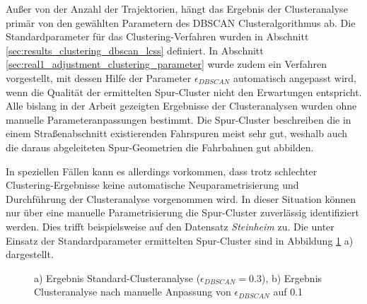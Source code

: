 Außer von der Anzahl der Trajektorien, hängt das Ergebnis der Clusteranalyse primär von den gewählten
Parametern des DBSCAN Clusteralgorithmus ab. Die Standardparameter für das Clustering-Verfahren wurden
in Abschnitt \ref{sec:results_clustering_dbscan_lcss} definiert. In Abschnitt \ref{sec:real1_adjustment_clustering_parameter}
wurde zudem ein Verfahren vorgestellt, mit dessen Hilfe der Parameter $\epsilon_{DBSCAN}$
automatisch angepasst wird, wenn die Qualität der ermittelten Spur-Cluster nicht den Erwartungen entspricht.
Alle bislang in der Arbeit gezeigten Ergebnisse der Clusteranalysen wurden ohne manuelle Parameteranpassungen bestimmt.
Die Spur-Cluster beschreiben die in einem Straßenabschnitt existierenden Fahrspuren meist sehr gut,
weshalb auch die daraus abgeleiteten Spur-Geometrien die Fahrbahnen gut abbilden.

In speziellen Fällen kann es allerdings vorkommen, dass trotz schlechter Clustering-Ergebnisse
keine automatische Neuparametrisierung und Durchführung der Clusteranalyse vorgenommen wird.
In dieser Situation können nur über eine manuelle Parametrisierung die Spur-Cluster zuverlässig identifiziert werden.
Dies trifft beispielsweise auf den Datensatz \textit{Steinheim} zu. Die unter Einsatz der Standardparameter
ermittelten Spur-Cluster sind in Abbildung \ref{fig:results_clusters_steinheim} a) dargestellt.

\begin{figure}
    \centering
    \qquad \qquad
    \caption[Ergebnisse Clusteranalyse Steinheim]
            {a) Ergebnis Standard-Clusteranalyse ($\epsilon_{DBSCAN} = 0.3$),
            b) Ergebnis Clusteranalyse nach manuelle Anpassung von $\epsilon_{DBSCAN}$ auf 0.1}
    \label{fig:results_clusters_steinheim}
\end{figure}

